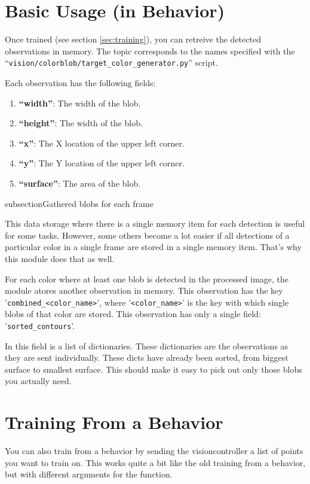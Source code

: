 \documentclass[a4paper, 10pt]{article}
\begin{document}
\section{Basic Usage (in Behavior)}

Once trained (see section \ref{sec:training}), you can retreive the detected observations in memory.
The topic corresponds to the names specified with the ``\lstinline{vision/colorblob/target_color_generator.py}'' script.

Each observation has the following fields:
\begin{enumerate}
    \item[\textbf{``width''}:] The width of the blob.
    \item[\textbf{``height''}:] The width of the blob.
    \item[\textbf{``x''}:] The X location of the upper left corner.
    \item[\textbf{``y''}:] The Y location of the upper left corner.
    \item[\textbf{``surface''}:] The area of the blob.
\end{enumerate}

subsection{Gathered blobs for each frame}

This data storage where there is a single memory item for each detection is useful for some tasks.
However, some others become a lot easier if all detections of a particular color in a single frame are stored in a single memory item.
That's why this module does that as well.

For each color where at least one blob is detected in the processed image, the module atores another observation in memory.
This observation has the key '\lstinline{combined_<color_name>}', where '\lstinline{<color_name>}' is the key with which single blobs of that color are stored.
This observation has only a single field: '\lstinline{sorted_contours}'.

In this field is a list of dictionaries. These dictionaries are the observations as they are sent individually.
These dicts have already been sorted, from biggest surface to smallest surface.
This should make it easy to pick out only those blobs you actually need.

\section{Training From a Behavior}

You can also train from a behavior by sending the visioncontroller a list of points you want to train on. This works quite a bit like the old training from a behavior, but with different arguments for the function.
\end{document}

